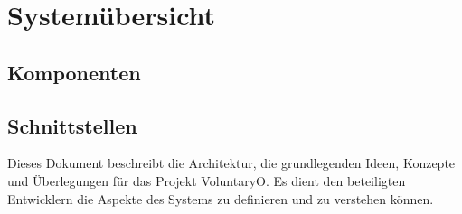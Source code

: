 \chapter{Systemübersicht}
	\section{Komponenten}
	\section{Schnittstellen}
	Dieses Dokument beschreibt die Architektur, die grundlegenden Ideen, Konzepte und Überlegungen für das Projekt VoluntaryO. Es dient den beteiligten Entwicklern die Aspekte des Systems zu definieren und zu verstehen können.